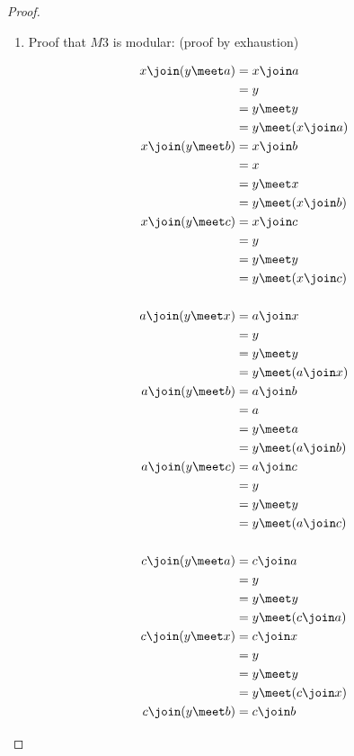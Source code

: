 \begin{proof}
\begin{enumerate}
  \item Proof that $M3$ is modular: (proof by exhaustion)
  \begin{multicols}{3}
    \begin{align*}
      x \join ( y \meet a)
        &= x \join a
      \\&= y
      \\&= y \meet y
      \\&= y \meet ( x\join a)
      \\
      x \join ( y \meet b)
        &= x \join b
      \\&= x
      \\&= y \meet x
      \\&= y \meet ( x\join b)
      \\
      x \join ( y \meet c)
        &= x \join c
      \\&= y
      \\&= y \meet y
      \\&= y \meet ( x\join c)
      \\
      \\
      a \join ( y \meet x)
        &= a \join x
      \\&= y
      \\&= y \meet y
      \\&= y \meet ( a\join x)
      \\
      a \join (y \meet b)
        &= a \join b
      \\&= a
      \\&= y \meet a
      \\&= y \meet (a\join b)
      \\
      a \join ( y \meet c)
        &= a \join c
      \\&= y
      \\&= y \meet y
      \\&= y \meet (a\join c)
      \\
      \\
      c \join ( y \meet a)
        &= c \join a
      \\&= y
      \\&= y \meet y
      \\&= y \meet (c\join a)
      \\
      c \join ( y \meet x)
        &= c \join x
      \\&= y
      \\&= y \meet y
      \\&= y \meet ( c\join x)
      \\
      c \join (y \meet b)
        &= c \join b

\end{align*}
\end{multicols}
\end{enumerate}
\end{proof}
